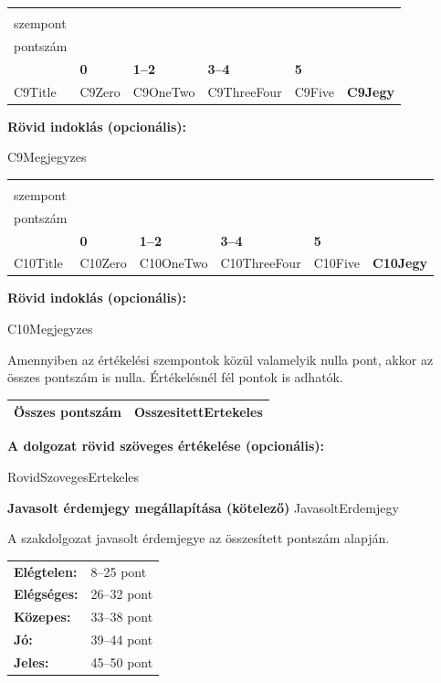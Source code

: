 \documentclass[a4paper,12pt]{article}
\newcommand{\EvaluationTable}[7]{

\renewcommand{\arraystretch}{1.35}

{\fontsize{9pt}{11pt}\selectfont

\begin{tabularx}{\textwidth}{|
>{\raggedright\arraybackslash}p{4.2cm}|
>{\centering\arraybackslash}X|
>{\centering\arraybackslash}X|
>{\centering\arraybackslash}X|
>{\centering\arraybackslash}X|
>{\centering\arraybackslash}p{1.8cm}|}

\hline

\multirow{2}{=}{\centering\textbf{Értékelési\\szempont}}
&
\multicolumn{4}{c|}{\textbf{Adható pontszám}}
&
\multirow{2}{=}{\centering\textbf{Elért\\pontszám}}
\\

\cline{2-5}

&
\textbf{0}
&
\textbf{1--2}
&
\textbf{3--4}
&
\textbf{5}
&
\\

\hline

#1
&
#2
&
#3
&
#4
&
#5
&
\textbf{#6}

\\
\hline

\end{tabularx}

\vspace{3mm}

\textbf{Rövid indoklás (opcionális):}

\vspace{2mm}

#7

\vspace{8mm}

}
}
\begin{document}
\EvaluationTable
{ {{C9Title}} }
{ {{C9Zero}} }
{ {{C9OneTwo}} }
{ {{C9ThreeFour}} }
{ {{C9Five}} }
{ {{C9Jegy}} }
{ {{C9Megjegyzes}} }

\EvaluationTable
{ {{C10Title}} }
{ {{C10Zero}} }
{ {{C10OneTwo}} }
{ {{C10ThreeFour}} }
{ {{C10Five}} }
{ {{C10Jegy}} }
{ {{C10Megjegyzes}} }

\bigskip

Amennyiben az értékelési szempontok közül valamelyik nulla pont, akkor az összes pontszám is nulla. Értékelésnél fél pontok is adhatók.

\bigskip

\begin{center}

\begin{tabular}{|l|c|}
\hline

\textbf{Összes pontszám} &
\textbf{{{OsszesitettErtekeles}}}

\\
\hline

\end{tabular}

\end{center}

\bigskip

\textbf{A dolgozat rövid szöveges értékelése (opcionális):}

\vspace{0.3cm}

{{RovidSzovegesErtekeles}}

\vspace{1cm}

\textbf{Javasolt érdemjegy megállapítása (kötelező)} {{JavasoltErdemjegy}}

\vspace{0.3cm}

A szakdolgozat javasolt érdemjegye az összesített pontszám alapján.

\bigskip

\begin{tabular}{ll}

\textbf{Elégtelen:} & 8--25 pont \\

\textbf{Elégséges:} & 26--32 pont \\

\textbf{Közepes:} & 33--38 pont \\

\textbf{Jó:} & 39--44 pont \\

\textbf{Jeles:} & 45--50 pont \\

\end{tabular}
\end{document}
